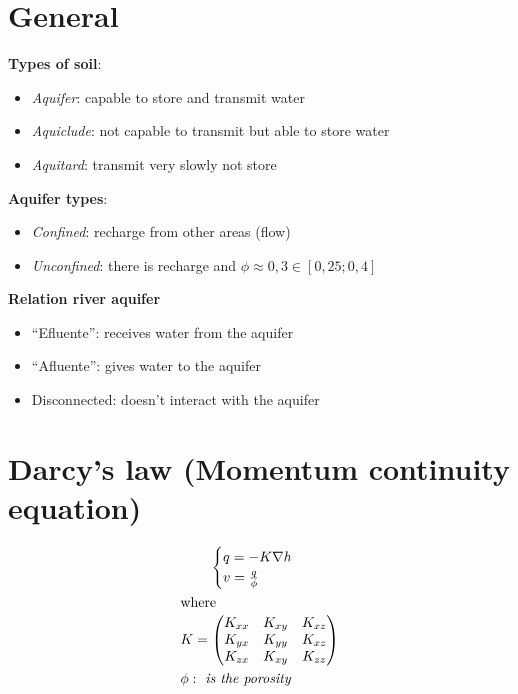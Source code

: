 \documentclass[landscape]{article}
\begin{document}
\begin{multicols*}{3}
\section{General} %
\label{sec:general}

\textbf{Types of soil}:
\begin{itemize}
  \item \emph{Aquifer}: capable to store and transmit water
  \item \emph{Aquiclude}: not capable to transmit but able to store water
  \item \emph{Aquitard}: transmit very slowly not store
\end{itemize}
\textbf{Aquifer types}: 
\begin{itemize}
  \item \emph{Confined}: recharge from other areas (flow)
  \item \emph{Unconfined}: there is recharge and $\phi \approx 0,3 \in [0,25;0,4]$
\end{itemize}
\textbf{Relation river aquifer}
\begin{itemize}
  \item ``Efluente'': receives water from the aquifer
  \item ``Afluente'': gives water to the aquifer
  \item Disconnected: doesn't interact with the aquifer
\end{itemize}

\section{Darcy’s law (Momentum continuity equation)} %
\label{sec:darcy_s_law}
  \begin{gather}\label{eq:2.1}
         \begin{cases}
           q = -K \nabla h \\
           v = \frac{q}{\phi}
         \end{cases}
        \notag\\
      \shortintertext{where}
      \begin{aligned}
        &K = \begin{pmatrix}
  K_{xx} & K_{xy} & K_{xz}\\
  K_{yx} & K_{yy} & K_{xz}\\
  K_{zx} & K_{xy} & K_{zz}
  \end{pmatrix} \\
  & \phi: \emph{ is the porosity}
      \end{aligned}\notag
  \end{gather}


\end{multicols*}
\end{document}
